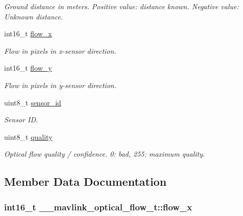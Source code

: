\begin{DoxyCompactItemize}
\begin{DoxyCompactList}\small\item\em Ground distance in meters. Positive value\+: distance known. Negative value\+: Unknown distance. \end{DoxyCompactList}\item 
int16\+\_\+t \hyperlink{struct____mavlink__optical__flow__t_a1e1332d4eb9a84f38d32af8f32ed8c10}{flow\+\_\+x}
\begin{DoxyCompactList}\small\item\em Flow in pixels in x-\/sensor direction. \end{DoxyCompactList}\item 
int16\+\_\+t \hyperlink{struct____mavlink__optical__flow__t_aaf2884728b3ae06ec464c9cf2f8ce1c2}{flow\+\_\+y}
\begin{DoxyCompactList}\small\item\em Flow in pixels in y-\/sensor direction. \end{DoxyCompactList}\item 
\hypertarget{struct____mavlink__optical__flow__t_a196e345c474b8fc63570ebad5f947544}{uint8\+\_\+t \hyperlink{struct____mavlink__optical__flow__t_a196e345c474b8fc63570ebad5f947544}{sensor\+\_\+id}}\label{struct____mavlink__optical__flow__t_a196e345c474b8fc63570ebad5f947544}

\begin{DoxyCompactList}\small\item\em Sensor I\+D. \end{DoxyCompactList}\item 
\hypertarget{struct____mavlink__optical__flow__t_a3efb901fe9c47c88f90ddfb73d76f542}{uint8\+\_\+t \hyperlink{struct____mavlink__optical__flow__t_a3efb901fe9c47c88f90ddfb73d76f542}{quality}}\label{struct____mavlink__optical__flow__t_a3efb901fe9c47c88f90ddfb73d76f542}

\begin{DoxyCompactList}\small\item\em Optical flow quality / confidence. 0\+: bad, 255\+: maximum quality. \end{DoxyCompactList}\end{DoxyCompactItemize}


\subsection{Member Data Documentation}
\hypertarget{struct____mavlink__optical__flow__t_a1e1332d4eb9a84f38d32af8f32ed8c10}{
\subsubsection[{flow\+\_\+x}]{\setlength{\rightskip}{0pt plus 5cm}int16\+\_\+t \+\_\+\+\_\+mavlink\+\_\+optical\+\_\+flow\+\_\+t\+::flow\+\_\+x}}\label{struct____mavlink__optical__flow__t_a1e1332d4eb9a84f38d32af8f32ed8c10}


